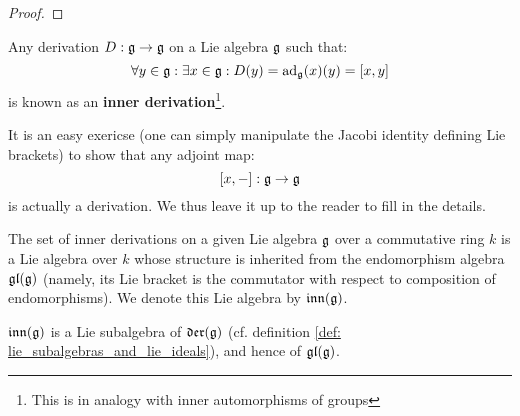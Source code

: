                         \begin{proof}
                            
                        \end{proof}
                    \begin{definition} \label{def: lie_algebra_inner_derivations}
                        Any derivation $D: \mathfrak{g} \to \mathfrak{g}$ on a Lie algebra $\mathfrak{g}$ such that:
                            $$\forall y \in \mathfrak{g}: \exists x \in \mathfrak{g}: D(y) = \mathrm{ad}_{\mathfrak{g}}(x)(y) = [x, y]$$
                        is known as an \textbf{inner derivation}\footnote{This is in analogy with inner automorphisms of groups}.
                    \end{definition}
                    \begin{remark}
                        It is an easy exericse (one can simply manipulate the Jacobi identity defining Lie brackets) to show that any adjoint map:
                            $$[x, -]: \mathfrak{g} \to \mathfrak{g}$$
                        is actually a derivation. We thus leave it up to the reader to fill in the details. 
                    \end{remark}
                    \begin{convention}
                        The set of inner derivations on a given Lie algebra $\mathfrak{g}$ over a commutative ring $k$ is a Lie algebra over $k$ whose structure is inherited from the endomorphism algebra $\mathfrak{gl}(\mathfrak{g})$ (namely, its Lie bracket is the commutator with respect to composition of endomorphisms). We denote this Lie algebra by $\mathfrak{inn}(\mathfrak{g})$.
                    \end{convention}
                    \begin{remark}
                        $\mathfrak{inn}(\mathfrak{g})$ is a Lie subalgebra of $\mathfrak{der}(\mathfrak{g})$ (cf. definition \ref{def: lie_subalgebras_and_lie_ideals}), and hence of $\mathfrak{gl}(\mathfrak{g})$. 
                    \end{remark}
                        
